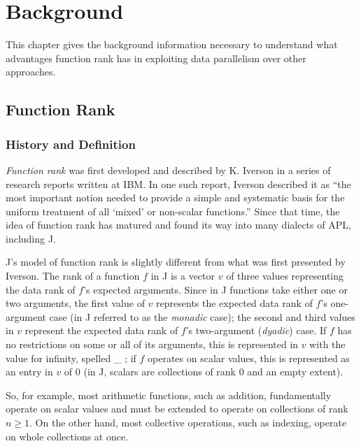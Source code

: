 
\chapter{Background}
\label{back}

This chapter gives the background information necessary to understand what advantages function rank has in exploiting data parallelism over other approaches.

\section{Function Rank}
\subsection{History and Definition}
\textit{Function rank} was first developed and described by K. Iverson in a series of research reports written at IBM. %
In one such report, Iverson described it as 
``the most important notion needed to provide a simple and systematic basis for the uniform treatment of all `mixed' or non-scalar functions.''\cite{rapl} %
Since that time, the idea of function rank has matured and found its way into many dialects of APL, including J.

J's model of function rank is slightly different from what was first presented by Iverson. \cite{rankanduni} \cite{jvocab}
The rank of a function $f$ in J is a vector $v$ of three values representing the data rank of $f$'s expected arguments.
Since in J functions take either one or two arguments, the first value of $v$ represents the expected data rank of $f$'s one-argument case (in J referred to as the \textit{monadic} case);
the second and third values in $v$ represent the expected data rank of $f$'s two-argument (\textit{dyadic}) case.
If $f$ has no restrictions on some or all of its arguments, this is represented in $v$ with the value for infinity, spelled \ttfamily \_ \normalfont ;
if $f$ operates on scalar values, this is represented as an entry in $v$ of 0 (in J, scalars are collections of rank 0 and an empty extent). %

So, for example, most arithmetic functions, such as addition, fundamentally operate on scalar values and must be extended to operate on collections of rank $n \ge 1$.
On the other hand, most collective operations, such as indexing, operate on whole collections at once.

